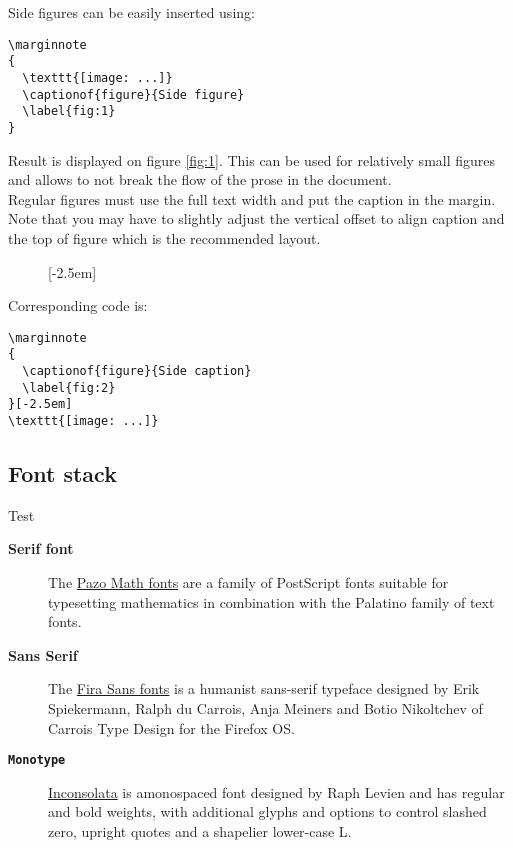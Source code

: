Side figures can be easily inserted using:
\begin{lstlisting}
\marginnote
{
  \texttt{[image: ...]}
  \captionof{figure}{Side figure}
  \label{fig:1}
}
\end{lstlisting}
Result is displayed on figure \ref{fig:1}. This can be used for relatively
small figures and allows to not break the flow of the prose in the document.\\


Regular figures must use the full text width and put the caption in the margin.
Note that you may have to slightly adjust the vertical offset to align caption
and the top of figure which is the recommended layout.\\

\begin{figure}[htbp]
  [-2.5em]
\end{figure}

Corresponding code is:
\begin{lstlisting}
\marginnote
{
  \captionof{figure}{Side caption}
  \label{fig:2}
}[-2.5em]
\texttt{[image: ...]}
\end{lstlisting}

\subsection*{Font stack}
Test
\begin{description}
\item[{\bfseries Serif font}] The
  \href{http://www.tug.dk/FontCatalogue/urwpalladio}{Pazo Math fonts} are a
  family of PostScript fonts suitable for typesetting mathematics in
  combination with the Palatino family of text fonts.
\item[{\sf \bfseries Sans Serif}] The
  \href{http://www.tug.dk/FontCatalogue/firasans/}{Fira Sans fonts} is a
  humanist sans-serif typeface designed by Erik Spiekermann, Ralph du Carrois,
  Anja Meiners and Botio Nikoltchev of Carrois Type Design for the Firefox OS.
\item[{\tt \bfseries Monotype}]
  \href{http://www.tug.dk/FontCatalogue/inconsolata/}{Inconsolata} is
  amonospaced font designed by Raph Levien and has regular and bold weights,
  with additional glyphs and options to control slashed zero, upright quotes
  and a shapelier lower-case L.
\end{description}

